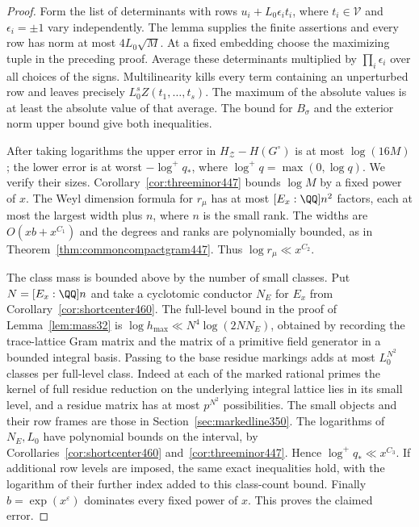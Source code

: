 \documentclass[a4paper,11pt]{article}
\theoremstyle{definition}
\theoremstyle{remark}
\numberwithin{equation}{section}
\begin{document}
\begin{proof}
Form the list of determinants with rows \(u_i+L_0\epsilon_i t_i\),
where \(t_i\in\mathcal V\) and \(\epsilon_i=\pm1\) vary independently.
The lemma supplies the finite assertions and every row has norm
at most \(4L_0\sqrt M\). At a fixed embedding choose the maximizing
tuple in the preceding proof. Average these determinants multiplied
by \(\prod_i\epsilon_i\) over all choices of the signs. Multilinearity
kills every term containing an unperturbed row and leaves precisely
\(L_0^s Z(t_1,\ldots,t_s)\). The maximum of the absolute values
is at least the absolute value of that average. The bound for
\(B_\sigma\) and the exterior norm upper bound give both inequalities.

After taking logarithms the upper error in \(H_{\mathcal Z}-H(G^\circ)\)
is at most \(\log(16M)\); the lower error is at worst
\(-\log^+ q_*\), where \(\log^+q=\max(0,\log q)\).
We verify their sizes. Corollary~\ref{cor:threeminor447} bounds
\(\log M\) by a fixed power of \(x\). The Weyl dimension formula
for \(r_\mu\) has at most \([E_x:\QQ]n^2\) factors, each at most
the largest width plus \(n\), where \(n\) is the small rank.
The widths are \(O(xb+x^{C_1})\) and the degrees and ranks are
polynomially bounded, as in Theorem~\ref{thm:commoncompactgram447}.
Thus \(\log r_\mu\ll x^{C_2}\).

The class mass is bounded above by the number of small classes.
Put \(N=[E_x:\QQ]n\) and take a cyclotomic conductor \(N_E\)
for \(E_x\) from Corollary~\ref{cor:shortcenter460}.
The full-level bound in the proof of Lemma~\ref{lem:mass32}
is \(\log h_{\max}\ll N^4\log(2NN_E)\), obtained by recording
the trace-lattice Gram matrix and the matrix of a primitive
field generator in a bounded integral basis. Passing to the
base residue markings adds at most \(L_0^{N^2}\) classes per
full-level class. Indeed at each of the marked rational primes
the kernel of full residue reduction on the underlying integral
lattice lies in its small level, and a residue matrix has at
most \(p^{N^2}\) possibilities. The small objects and their
row frames are those in Section~\ref{sec:markedline350}.
The logarithms of \(N_E,L_0\) have polynomial bounds on the
interval, by Corollaries~\ref{cor:shortcenter460}
and~\ref{cor:threeminor447}. Hence \(\log^+q_*\ll x^{C_3}\).
If additional row levels are imposed, the same exact inequalities
hold, with the logarithm of their further index added to this
class-count bound. Finally \(b=\exp(x^\varepsilon)\) dominates
every fixed power of \(x\). This proves the claimed error.
\end{proof}
\end{document}
